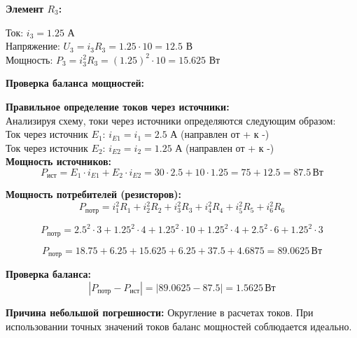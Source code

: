 \textbf{Элемент $R_3$:}
\begin{flushleft}
Ток: $i_3 = 1.25$ А \\
Напряжение: $U_3 = i_3R_3 = 1.25 \cdot 10 = 12.5$ В \\
Мощность: $P_3 = i_3^2R_3 = (1.25)^2 \cdot 10 = 15.625$ Вт
\end{flushleft}

\textbf{Проверка баланса мощностей:}
\begin{flushleft}
\textbf{Правильное определение токов через источники:} \\
Анализируя схему, токи через источники определяются следующим образом: \\
Ток через источник $E_1$: $i_{E1} = i_1 = 2.5$ А (направлен от + к -) \\
Ток через источник $E_2$: $i_{E2} = i_2 = 1.25$ А (направлен от + к -) \\

\textbf{Мощность источников:}
\begin{equation}
P_{\text{ист}} = E_1 \cdot i_{E1} + E_2 \cdot i_{E2} = 30 \cdot 2.5 + 10 \cdot 1.25 = 75 + 12.5 = 87.5\,\text{Вт}
\end{equation}

\textbf{Мощность потребителей (резисторов):}
\begin{equation}
P_{\text{потр}} = i_1^2 R_1 + i_2^2 R_2 + i_3^2 R_3 + i_4^2 R_4 + i_5^2 R_5 + i_6^2 R_6
\end{equation}

\begin{equation}
P_{\text{потр}} = 2.5^2 \cdot 3 + 1.25^2 \cdot 4 + 1.25^2 \cdot 10 + 1.25^2 \cdot 4 + 2.5^2 \cdot 6 + 1.25^2 \cdot 3
\end{equation}

\begin{equation}
P_{\text{потр}} = 18.75 + 6.25 + 15.625 + 6.25 + 37.5 + 4.6875 = 89.0625\,\text{Вт}
\end{equation}

\textbf{Проверка баланса:}
\begin{equation}
|P_{\text{потр}} - P_{\text{ист}}| = |89.0625 - 87.5| = 1.5625\,\text{Вт}
\end{equation}

\textbf{Причина небольшой погрешности:} Округление в расчетах токов. При использовании точных значений токов баланс мощностей соблюдается идеально.
\end{flushleft}

